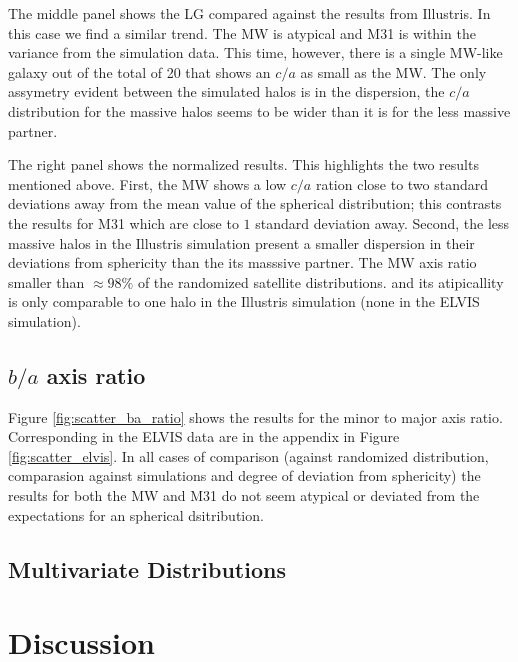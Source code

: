 \documentclass[a4paper,fleqn,usenatbib]{mnras}
\begin{document}
The middle panel shows the LG compared against the results from
Illustris. In this case we find a similar trend. The MW is atypical
and M31 is within the variance from the simulation data.
This time, however, there is a single MW-like galaxy out of the total
of 20 that shows an $c/a$ as small as the MW.
The only assymetry evident between the simulated halos is in the
dispersion, the $c/a$ distribution for the massive halos seems to be
wider than it is for the less massive partner. 

The right panel shows the normalized results. 
This highlights the two results mentioned above.
First, the MW shows a low $c/a$ ration close to two standard deviations away
from the mean value of the spherical distribution; this contrasts the
results for M31 which are close to $1$ standard deviation away.
Second, the less massive halos in the Illustris simulation present a
smaller dispersion in their deviations from sphericity than the
its masssive partner.
The MW axis ratio smaller than $\approx 98\%$ of the randomized
satellite distributions.   and its atipicallity is only comparable to
one halo in the Illustris  simulation (none in the ELVIS simulation).


\subsection{$b/a$ axis ratio}

Figure \ref{fig:scatter_ba_ratio} shows the results for the minor to
major axis ratio. 
Corresponding in the ELVIS data are in the appendix in Figure
\ref{fig:scatter_elvis}.
In all cases of comparison (against randomized distribution,
comparasion against simulations and degree of deviation from
sphericity) the results for both the MW and M31 do not seem atypical
or deviated from the expectations for an spherical dsitribution.



\subsection{Multivariate Distributions}


\section{Discussion}
\end{document}
